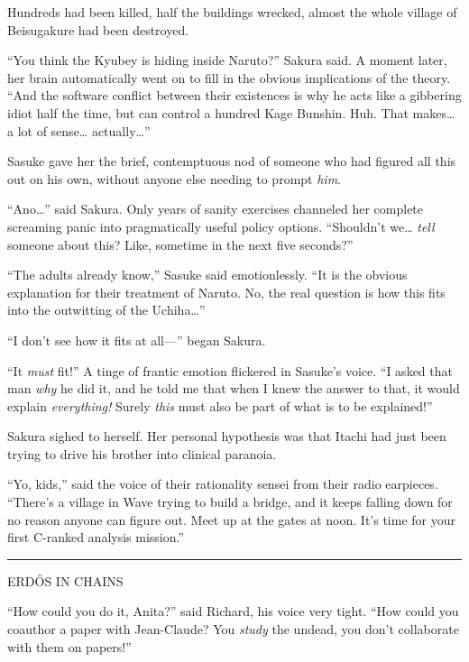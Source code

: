 Hundreds had been killed, half the buildings wrecked, almost the whole
village of Beisugakure had been destroyed.

``You think the Kyubey is hiding inside Naruto?'' Sakura said. A moment
later, her brain automatically went on to fill in the obvious
implications of the theory. ``And the software conflict between their
existences is why he acts like a gibbering idiot half the time, but can
control a hundred Kage Bunshin. Huh. That makes\ldots{} a lot of
sense\ldots{} actually\ldots{}''

Sasuke gave her the brief, contemptuous nod of someone who had figured
all this out on his own, without anyone else needing to prompt
\emph{him}.

``Ano\ldots{}'' said Sakura. Only years of sanity exercises channeled
her complete screaming panic into pragmatically useful policy options.
``Shouldn't we\ldots{} \emph{tell} someone about this? Like, sometime in
the next five seconds?''

``The adults already know,'' Sasuke said emotionlessly. ``It is the
obvious explanation for their treatment of Naruto. No, the real question
is how this fits into the outwitting of the Uchiha\ldots{}''

``I don't see how it fits at all---'' began Sakura.

``It \emph{must} fit!'' A tinge of frantic emotion flickered in Sasuke's
voice. ``I asked that man \emph{why} he did it, and he told me that when
I knew the answer to that, it would explain \emph{everything!} Surely
\emph{this} must also be part of what is to be explained!''

Sakura sighed to herself. Her personal hypothesis was that Itachi had
just been trying to drive his brother into clinical paranoia.

``Yo, kids,'' said the voice of their rationality sensei from their
radio earpieces. ``There's a village in Wave trying to build a bridge,
and it keeps falling down for no reason anyone can figure out. Meet up
at the gates at noon. It's time for your first C-ranked analysis
mission.''

\begin{center}\rule{3in}{0.4pt}\end{center}

ERDŐS IN CHAINS

``How could you do it, Anita?'' said Richard, his voice very tight.
``How could you coauthor a paper with Jean-Claude? You \emph{study} the
undead, you don't collaborate with them on papers!''

